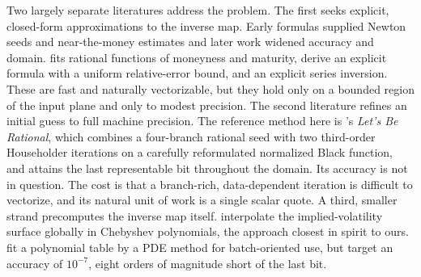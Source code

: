 \documentclass[11pt]{article}
\begin{document}
Two largely separate literatures address the problem. The first seeks explicit, closed-form approximations to the inverse map. Early formulas supplied Newton seeds and near-the-money estimates \citep{manaster1982calculation,brenner1988simple,corrado1996note} and later work widened accuracy and domain. \citet{li2008approximate} fits rational functions of moneyness and maturity, \citet{stefanica2017explicit} derive an explicit formula with a uniform relative-error bound, and \citet{xiacui2018exact} an explicit series inversion. These are fast and naturally vectorizable, but they hold only on a bounded region of the input plane and only to modest precision. The second literature refines an initial guess to full machine precision. The reference method here is \citet{jackel2015rational}'s \emph{Let's Be Rational}, which combines a four-branch rational seed with two third-order Householder iterations on a carefully reformulated normalized Black function, and attains the last representable bit throughout the domain. Its accuracy is not in question. The cost is that a branch-rich, data-dependent iteration is difficult to vectorize, and its natural unit of work is a single scalar quote. A third, smaller strand precomputes the inverse map itself. \citet{glau2019chebyshev} interpolate the implied-volatility surface globally in Chebyshev polynomials, the approach closest in spirit to ours. \citet{matic2019pde} fit a polynomial table by a PDE method for batch-oriented use, but target an accuracy of $10^{-7}$, eight orders of magnitude short of the last bit.
\end{document}
